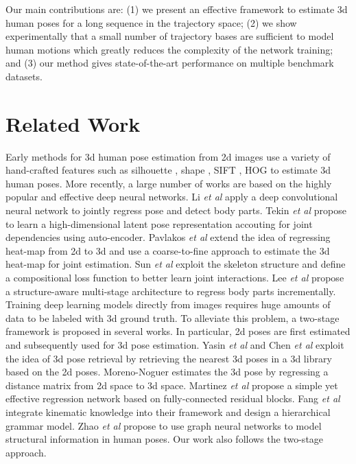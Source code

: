 \documentclass{bmvc2k}
\def\etal{\emph{et al}\bmvaOneDot}
\begin{document}
Our main contributions are: (1) we present an effective framework to estimate 3d human poses for a long sequence in the trajectory space; (2) we show experimentally that a small number of trajectory bases are sufficient to model human motions which greatly reduces the complexity of the network training; and (3) our method gives state-of-the-art performance on multiple benchmark datasets.





\section{Related Work}
\label{sec:literature}
Early methods for
3d human pose estimation from 2d images
use a variety of hand-crafted features such as silhouette \cite{agarwal20043d}, shape \cite{mori2006recovering}, SIFT \cite{bo2008fast}, HOG \cite{rogez2008randomized} to estimate 3d human poses. More recently, a large number of works are based on the highly popular and effective deep neural networks. 
Li \etal \cite{li20143d} apply a deep convolutional neural network to jointly regress pose and detect body parts.
Tekin \etal \cite{tekin2016structured} propose to learn a high-dimensional latent pose representation accouting for joint dependencies using auto-encoder.
Pavlakos \etal \cite{pavlakos2017coarse} extend the idea of regressing heat-map from 2d to 3d and use a coarse-to-fine approach to estimate the 3d heat-map for joint estimation.
Sun \etal \cite{sun2017compositional} exploit the skeleton structure and define a compositional loss function to better learn joint interactions.
Lee \etal \cite{lee2018propagating} propose a structure-aware multi-stage architecture to regress body parts incrementally.
Training deep learning models directly from images requires huge amounts of data to be labeled with 3d ground truth. To alleviate this problem, a two-stage framework is proposed in several works. In particular, 2d poses are first estimated and subsequently used for 3d pose estimation.
Yasin \etal \cite{yasin2016dual} and Chen \etal \cite{chen20173d} exploit the idea of 3d pose retrieval by retrieving the nearest 3d poses in a 3d library based on the 2d poses.
Moreno-Noguer \cite{moreno20173d} estimates the 3d pose by regressing a distance matrix from 2d space to 3d space.
Martinez \etal \cite{martinez2017simple} propose a simple yet effective regression network based on fully-connected residual blocks.
Fang \etal \cite{fang2018learning} integrate kinematic knowledge into their framework and design a hierarchical grammar model.
Zhao \etal \cite{zhao2019semantic} propose to use graph neural networks to model structural information in human poses.
Our work also follows the two-stage approach.
\end{document}
